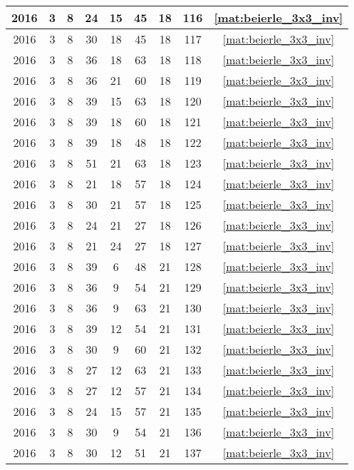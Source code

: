 \begin{longtable}{|c|c|c|c|c|c|c|c|c|}
2016 & 3 & 8 & 24 & 15 & 45 & 18 & 116 & \eqref{mat:beierle_3x3_inv} \\ \hline 
2016 & 3 & 8 & 30 & 18 & 45 & 18 & 117 & \eqref{mat:beierle_3x3_inv} \\ \hline 
2016 & 3 & 8 & 36 & 18 & 63 & 18 & 118 & \eqref{mat:beierle_3x3_inv} \\ \hline 
2016 & 3 & 8 & 36 & 21 & 60 & 18 & 119 & \eqref{mat:beierle_3x3_inv} \\ \hline 
2016 & 3 & 8 & 39 & 15 & 63 & 18 & 120 & \eqref{mat:beierle_3x3_inv} \\ \hline 
2016 & 3 & 8 & 39 & 18 & 60 & 18 & 121 & \eqref{mat:beierle_3x3_inv} \\ \hline 
2016 & 3 & 8 & 39 & 18 & 48 & 18 & 122 & \eqref{mat:beierle_3x3_inv} \\ \hline 
2016 & 3 & 8 & 51 & 21 & 63 & 18 & 123 & \eqref{mat:beierle_3x3_inv} \\ \hline 
2016 & 3 & 8 & 21 & 18 & 57 & 18 & 124 & \eqref{mat:beierle_3x3_inv} \\ \hline 
2016 & 3 & 8 & 30 & 21 & 57 & 18 & 125 & \eqref{mat:beierle_3x3_inv} \\ \hline 
2016 & 3 & 8 & 24 & 21 & 27 & 18 & 126 & \eqref{mat:beierle_3x3_inv} \\ \hline 
2016 & 3 & 8 & 21 & 24 & 27 & 18 & 127 & \eqref{mat:beierle_3x3_inv} \\ \hline 
2016 & 3 & 8 & 39 & 6 & 48 & 21 & 128 & \eqref{mat:beierle_3x3_inv} \\ \hline 
2016 & 3 & 8 & 36 & 9 & 54 & 21 & 129 & \eqref{mat:beierle_3x3_inv} \\ \hline 
2016 & 3 & 8 & 36 & 9 & 63 & 21 & 130 & \eqref{mat:beierle_3x3_inv} \\ \hline 
2016 & 3 & 8 & 39 & 12 & 54 & 21 & 131 & \eqref{mat:beierle_3x3_inv} \\ \hline 
2016 & 3 & 8 & 30 & 9 & 60 & 21 & 132 & \eqref{mat:beierle_3x3_inv} \\ \hline 
2016 & 3 & 8 & 27 & 12 & 63 & 21 & 133 & \eqref{mat:beierle_3x3_inv} \\ \hline 
2016 & 3 & 8 & 27 & 12 & 57 & 21 & 134 & \eqref{mat:beierle_3x3_inv} \\ \hline 
2016 & 3 & 8 & 24 & 15 & 57 & 21 & 135 & \eqref{mat:beierle_3x3_inv} \\ \hline 
2016 & 3 & 8 & 30 & 9 & 54 & 21 & 136 & \eqref{mat:beierle_3x3_inv} \\ \hline 
2016 & 3 & 8 & 30 & 12 & 51 & 21 & 137 & \eqref{mat:beierle_3x3_inv} \\ \hline 

\end{longtable}
